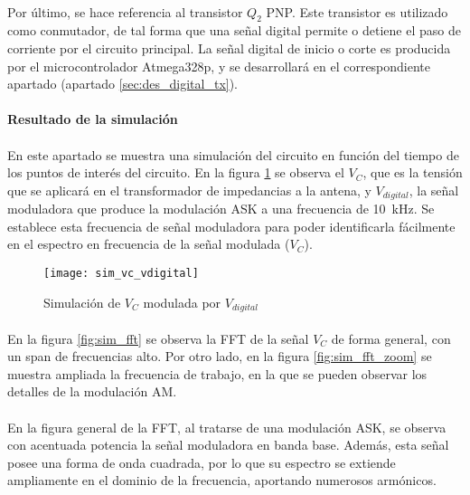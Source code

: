 \paragraph{} 
Por último, se hace referencia al transistor $Q_2$ PNP. %
Este transistor es utilizado como conmutador, de tal forma que una señal digital permite o detiene el paso de corriente por el circuito principal. La señal digital de inicio o corte es producida por el microcontrolador Atmega328p, y se desarrollará en el correspondiente apartado (apartado \ref{sec:des_digital_tx}).


\paragraph{Resultado de la simulaci\'on} %
\paragraph{}
En este apartado se muestra una simulación del circuito en función del tiempo de los puntos de interés del circuito. 
En la figura \ref{fig:sim_vc_vdig} se observa el $V_C$, que es la tensión que se aplicará en el transformador de impedancias a la antena, y $V_{digital}$, la señal moduladora que produce la modulación ASK a una frecuencia de \SI{10}{\kilo\hertz}. Se establece esta frecuencia de señal moduladora para poder identificarla fácilmente en el espectro en frecuencia de la señal modulada ($V_C$).
\begin{figure}[h]
    \centering
    \texttt{[image: sim\_vc\_vdigital]}
    \caption{Simulaci\'on de $V_C$ modulada por $V_{digital}$}
    \label{fig:sim_vc_vdig}
\end{figure}
\paragraph{}
En la figura \ref{fig:sim_fft} se observa la FFT de la señal $V_C$ de forma general, con un span de frecuencias alto. Por otro lado, en la figura \ref{fig:sim_fft_zoom} se muestra ampliada la frecuencia de trabajo, en la que se pueden observar los detalles de la modulación AM.
\paragraph{}
En la figura general de la FFT, al tratarse de una modulación ASK, se observa con acentuada potencia la señal moduladora en banda base. Además, esta señal posee una forma de onda cuadrada, por lo que su espectro se extiende ampliamente en el dominio de la frecuencia, aportando numerosos armónicos.
